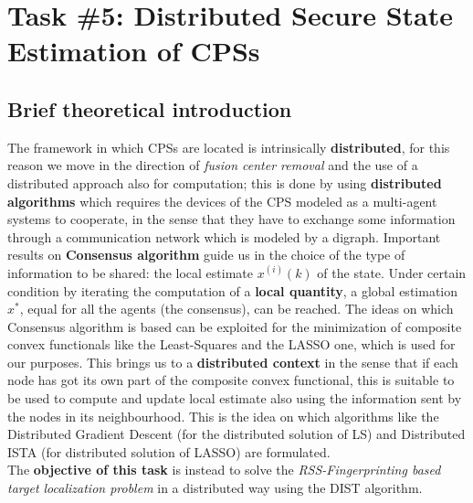 \section*{Task \#5: Distributed Secure State Estimation of CPSs}

\subsection*{Brief theoretical introduction}
The framework in which CPSs are located is intrinsically \textbf{distributed}, for this reason we move in the direction of \textit{fusion center removal} and the use of a distributed approach also for computation; this is done by using \textbf{distributed algorithms} which requires the devices of the CPS modeled as a multi-agent systems to 
cooperate, in the sense that they have to exchange some information through a communication network which is modeled by a digraph. 
Important results on \textbf{Consensus algorithm} guide us in the choice of the type of information to be shared: the local estimate $x^{(i)}(k)$ of the state. Under certain condition by iterating the computation of a \textbf{local quantity}, a global estimation $x^*$, equal for all the agents (the consensus), can be reached.
The ideas on which Consensus algorithm is based can be exploited for the minimization of composite convex functionals like the Least-Squares and the LASSO one, which is used for our purposes.
This brings us to a \textbf{distributed context} in the sense that if each node has got its own part of the composite convex functional, this is suitable to be used to compute and update local estimate also using the information sent by the nodes in its neighbourhood. This is the idea on which algorithms like the Distributed Gradient Descent (for the distributed solution of LS) and Distributed ISTA (for distributed solution of LASSO) are formulated.\\
The \textbf{objective of this task} is instead to solve the \textit{RSS-Fingerprinting based target localization problem} in a distributed way using the DIST algorithm.
 

